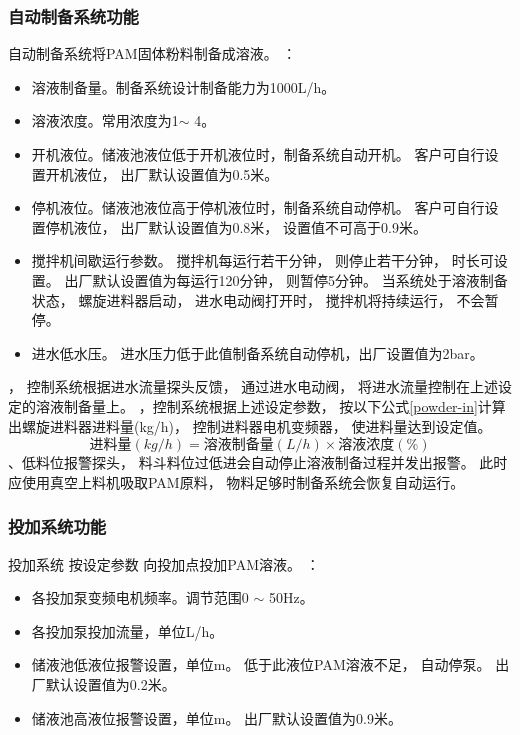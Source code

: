 \documentclass[UTF8,a4paper,12pt,titlepage]{ctexart}
\begin{document}
      \subsubsection{自动制备系统功能}
         自动制备系统将PAM固体粉料制备成溶液。
         ：
         \begin{itemize}
            \item 溶液制备量。制备系统设计制备能力为1000L/h。
            \item 溶液浓度。常用浓度为1\textperthousand $\sim$ 4\textperthousand。
            \item 开机液位。储液池液位低于开机液位时，制备系统自动开机。
               客户可自行设置开机液位，
               出厂默认设置值为0.5米。
            \item 停机液位。储液池液位高于停机液位时，制备系统自动停机。
               客户可自行设置停机液位，
               出厂默认设置值为0.8米，
               设置值不可高于0.9米。
            \item 搅拌机间歇运行参数。
            搅拌机每运行若干分钟，
            则停止若干分钟，
            时长可设置。
            出厂默认设置值为每运行120分钟，
            则暂停5分钟。
            当系统处于溶液制备状态，
            螺旋进料器启动，
            进水电动阀打开时，
            搅拌机将持续运行，
            不会暂停。
            \item 进水低水压。
            进水压力低于此值制备系统自动停机，出厂设置值为2bar。
         \end{itemize}
         ，
         控制系统根据进水流量探头反馈，
         通过进水电动阀，
         将进水流量控制在上述设定的溶液制备量上。
         ，控制系统根据上述设定参数，
         按以下公式\ref{powder-in}计算出螺旋进料器进料量(kg/h)，
         控制进料器电机变频器，
         使进料量达到设定值。
         \begin{equation}
            \label{powder-in}
            \mbox{进料量}(kg/h) = \mbox{溶液制备量}(L/h)  \times \mbox{溶液浓度} (\%)
         \end{equation}
         、低料位报警探头，
         料斗料位过低进会自动停止溶液制备过程并发出报警。
         此时应使用真空上料机吸取PAM原料，
         物料足够时制备系统会恢复自动运行。

      \subsubsection{投加系统功能}
         投加系统
         按设定参数
         向投加点投加PAM溶液。
         ：
         \begin{itemize}
            \item 各投加泵变频电机频率。调节范围0 $\sim$ 50Hz。
            \item 各投加泵投加流量，单位L/h。
            \item 储液池低液位报警设置，单位m。
            低于此液位PAM溶液不足，
            自动停泵。
               出厂默认设置值为0.2米。
            \item 储液池高液位报警设置，单位m。
               出厂默认设置值为0.9米。
         \end{itemize}
\end{document}
